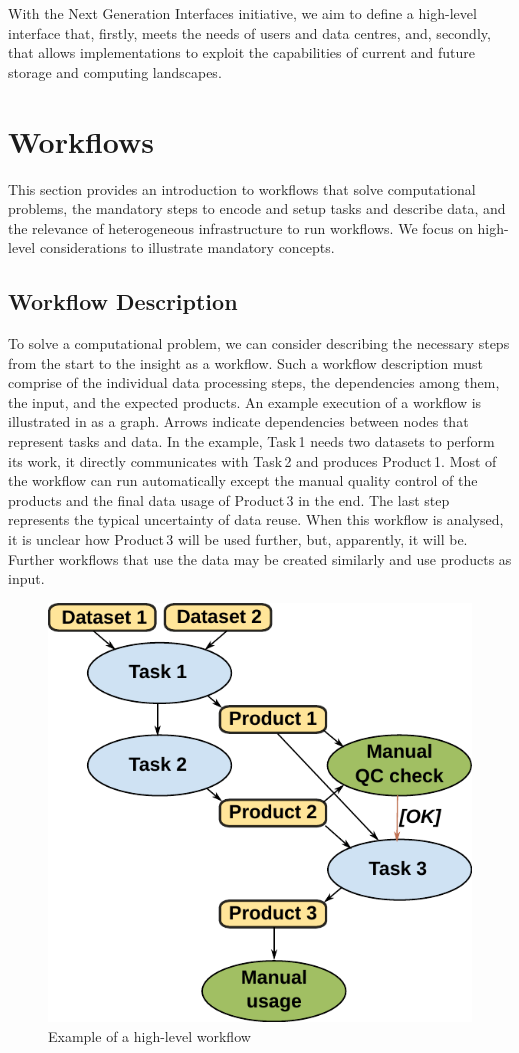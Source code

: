\documentclass[a4paper]{article}
\begin{document}
{{With the Next Generation Interfaces initiative, we aim to define a high-level interface that, firstly, meets the needs of users and data centres, and, secondly, that allows implementations to exploit the capabilities of current and future storage and computing landscapes.

\section{Workflows}

This section provides an introduction to workflows that solve computational problems, the mandatory steps to encode and setup tasks and describe data, and the relevance of heterogeneous infrastructure to run workflows.
We focus on high-level considerations to illustrate mandatory concepts.

\subsection{Workflow Description}

To solve a computational problem, we can consider describing the necessary steps from the start to the insight as a workflow.
Such a workflow description must comprise of the individual data processing steps, the dependencies among them, the input, and the expected products. An example execution of a workflow is illustrated in  as a graph.
Arrows indicate dependencies between nodes that represent tasks and data.
In the example, Task\,1 needs two datasets to perform its work, it directly communicates with Task\,2 and produces Product\,1.
Most of the workflow can run automatically except the manual quality control of the products and the final data usage of Product\,3 in the end.
The last step represents the typical uncertainty of data reuse. When this workflow is analysed, it is unclear how Product\,3 will be used further, but, apparently, it will be.
Further workflows that use the data may be created similarly and use products as input.

\begin{figure}[H]
  \centering
  \includegraphics[width=0.4\columnwidth]{workflow}
  \caption{Example of a high-level workflow}
  \label{fig:workflow}
\end{figure}

}}
\end{document}
